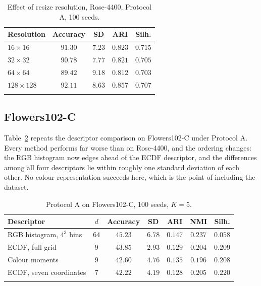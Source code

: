 \documentclass[pdflatex,sn-basic]{sn-jnl}
\theoremstyle{thmstyleone}%
\theoremstyle{thmstyletwo}%
\theoremstyle{thmstylethree}%
\begin{document}
\begin{table}[h]
\centering
\caption{Effect of resize resolution, Rose-4400, Protocol A, 100
seeds.}\label{tab:ablation-size}
\begin{tabular}{@{}lcccc@{}}
\toprule
Resolution & Accuracy & SD & ARI & Silh. \\
\midrule
$16\times16$   & $91.30$ & $7.23$ & $0.823$ & $\mathbf{0.715}$ \\
$32\times32$   & $90.78$ & $7.77$ & $0.821$ & $0.705$ \\
$64\times64$   & $89.42$ & $9.18$ & $0.812$ & $0.703$ \\
$128\times128$ & $\mathbf{92.11}$ & $8.63$ & $\mathbf{0.857}$ & $0.707$ \\
\botrule
\end{tabular}
\end{table}

\subsection{Flowers102-C}\label{sec:flowers}

Table~\ref{tab:flowers-descriptors} repeats the descriptor comparison on
Flowers102-C under Protocol A. Every method performs far worse than on
Rose-4400, and the ordering changes: the RGB histogram now edges ahead of the
ECDF descriptor, and the differences among all four descriptors lie within
roughly one standard deviation of each other. No colour representation
succeeds here, which is the point of including the dataset.

\begin{table}[h]
\centering
\caption{Protocol A on Flowers102-C, 100 seeds, $K=5$.}
\label{tab:flowers-descriptors}
\begin{tabular}{@{}lcccccc@{}}
\toprule
Descriptor & $d$ & Accuracy & SD & ARI & NMI & Silh. \\
\midrule
RGB histogram, $4^3$ bins & $64$ & $45.23$ & $6.78$ & $0.147$ & $0.237$ & $0.058$ \\
ECDF, full grid           & $9$  & $43.85$ & $2.93$ & $0.129$ & $0.204$ & $0.209$ \\
Colour moments            & $9$  & $42.60$ & $4.76$ & $0.135$ & $0.196$ & $0.208$ \\
ECDF, seven coordinates   & $7$  & $42.22$ & $4.19$ & $0.128$ & $0.205$ & $0.220$ \\
\botrule
\end{tabular}
\end{table}
\end{document}
